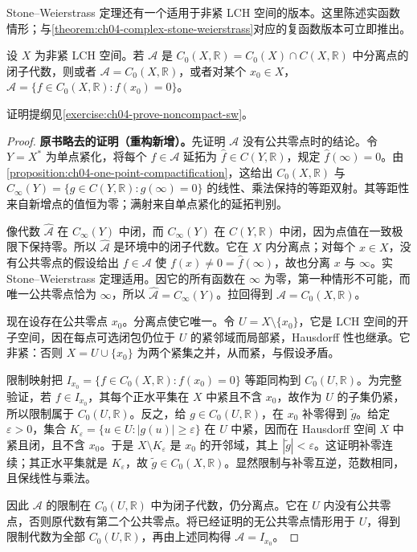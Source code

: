 \documentclass[../../main.tex]{subfiles}%
\begin{document}
Stone--Weierstrass 定理还有一个适用于非紧 LCH 空间的版本。这里陈述实函数情形；与\cref{theorem:ch04-complex-stone-weierstrass}对应的复函数版本可立即推出。
\begin{theorem}\label{theorem:ch04-noncompact-stone-weierstrass}
设 $X$ 为非紧 LCH 空间。若 $\mathcal A$ 是 $C_0(X,\mathbb R)=C_0(X)\cap C(X,\mathbb R)$ 中分离点的闭子代数，则或者 $\mathcal A=C_0(X,\mathbb R)$，或者对某个 $x_0\in X$，$\mathcal A=\{f\in C_0(X,\mathbb R):f(x_0)=0\}$。
\end{theorem}
证明提纲见\cref{exercise:ch04-prove-noncompact-sw}。
\begin{proof}
\textbf{原书略去的证明（重构新增）。}先证明 $\mathcal A$ 没有公共零点时的结论。令 $Y=X^*$ 为单点紧化，将每个 $f\in\mathcal A$ 延拓为 $\widehat f\in C(Y,\mathbb R)$，规定 $\widehat f(\infty)=0$。由\cref{proposition:ch04-one-point-compactification}，这给出 $C_0(X,\mathbb R)$ 与 $C_\infty(Y)=\{g\in C(Y,\mathbb R):g(\infty)=0\}$ 的线性、乘法保持的等距双射。其等距性来自新增点的值恒为零；满射来自单点紧化的延拓判别。

像代数 $\widehat{\mathcal A}$ 在 $C_\infty(Y)$ 中闭，而 $C_\infty(Y)$ 在 $C(Y,\mathbb R)$ 中闭，因为点值在一致极限下保持零。所以 $\widehat{\mathcal A}$ 是环境中的闭子代数。它在 $X$ 内分离点；对每个 $x\in X$，没有公共零点的假设给出 $f\in\mathcal A$ 使 $f(x)\ne0=\widehat f(\infty)$，故也分离 $x$ 与 $\infty$。实 Stone--Weierstrass 定理适用。因它的所有函数在 $\infty$ 为零，第一种情形不可能，而唯一公共零点恰为 $\infty$，所以 $\widehat{\mathcal A}=C_\infty(Y)$。拉回得到 $\mathcal A=C_0(X,\mathbb R)$。

现在设存在公共零点 $x_0$。分离点使它唯一。令 $U=X\setminus\{x_0\}$，它是 LCH 空间的开子空间，因在每点可选闭包仍位于 $U$ 的紧邻域而局部紧，Hausdorff 性也继承。它非紧：否则 $X=U\cup\{x_0\}$ 为两个紧集之并，从而紧，与假设矛盾。

限制映射把 $I_{x_0}=\{f\in C_0(X,\mathbb R):f(x_0)=0\}$ 等距同构到 $C_0(U,\mathbb R)$。为完整验证，若 $f\in I_{x_0}$，其每个正水平集在 $X$ 中紧且不含 $x_0$，故作为 $U$ 的子集仍紧，所以限制属于 $C_0(U,\mathbb R)$。反之，给 $g\in C_0(U,\mathbb R)$，在 $x_0$ 补零得到 $\widetilde g$。给定 $\varepsilon>0$，集合 $K_\varepsilon=\{u\in U:|g(u)|\ge\varepsilon\}$ 在 $U$ 中紧，因而在 Hausdorff 空间 $X$ 中紧且闭，且不含 $x_0$。于是 $X\setminus K_\varepsilon$ 是 $x_0$ 的开邻域，其上 $|\widetilde g|<\varepsilon$。这证明补零连续；其正水平集就是 $K_\varepsilon$，故 $\widetilde g\in C_0(X,\mathbb R)$。显然限制与补零互逆，范数相同，且保线性与乘法。

因此 $\mathcal A$ 的限制在 $C_0(U,\mathbb R)$ 中为闭子代数，仍分离点。它在 $U$ 内没有公共零点，否则原代数有第二个公共零点。将已经证明的无公共零点情形用于 $U$，得到限制代数为全部 $C_0(U,\mathbb R)$，再由上述同构得 $\mathcal A=I_{x_0}$。
\end{proof}
\end{document}
